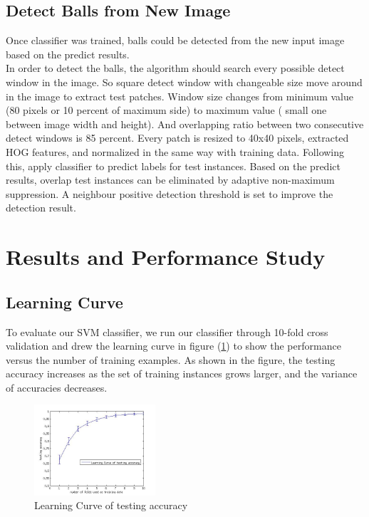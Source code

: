 \documentclass{article}
\begin{document}
\subsection{Detect Balls from New Image}
Once classifier was trained, balls could be detected from the new input image based on the predict results. \\
In order to detect the balls, the algorithm should search every possible detect window in the image. So square detect window with changeable size move around in the image to extract test patches. Window size changes from minimum value (80 pixels or 10 percent of maximum side) to maximum value ( small one between image width and height). And overlapping ratio between two consecutive detect windows is 85 percent.  Every patch is resized to 40x40 pixels, extracted HOG features, and normalized in the same way with training data. Following this, apply classifier to predict labels for test instances. Based on the predict results, overlap test instances can be eliminated by adaptive non-maximum suppression. A neighbour positive detection threshold is set to improve the detection result. 

\section{Results and Performance Study}
\subsection{Learning Curve}
To evaluate our SVM classifier, we run our classifier through 10-fold cross validation and drew the learning curve in figure (\ref{fig:learning curve}) to show the performance versus the number of training examples. As shown in the figure, the testing accuracy increases as the set of training instances grows larger, and the variance of accuracies decreases. 
\begin{figure}[htb]
\centering
\includegraphics[width = 0.4\textwidth]{learningcurve.jpg}
\caption{Learning Curve of testing accuracy}
\label{fig:learning curve}
\end{figure}
\end{document}
